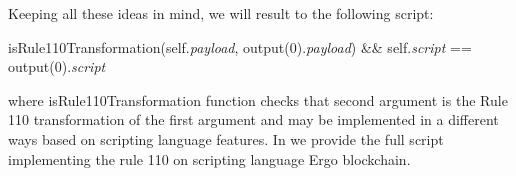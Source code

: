 \documentclass[runningheads]{llncs}
\newcommand{\dnote}[1]{\textcolor{red}{D: {#1}}}
\newcommand{\payload}{\textit{payload}}
\newcommand{\script}{\textit{script}}
\newcommand{\And}{\&\&}
\def\Let#1#2{\State #1 $\gets$ #2}
\begin{document}
    Keeping all these ideas in mind, we will result to the following script:

    \begin{algorithm}[H]
        \caption{Output protecting \script{}}
        \begin{algorithmic}[1]
            \State isRule110Transformation(self.\payload{}, output(0).\payload{}) \And{}
            \State self.\script{} == output(0).\script{}
            \vskip8pt
        \end{algorithmic}
    \end{algorithm}

    where isRule110Transformation function checks that second argument is the Rule 110
    transformation of the first argument and may be implemented in a different ways based
    on scripting language features. In  we provide the
    full script implementing the rule 110 on scripting language Ergo blockchain.

\end{document}
